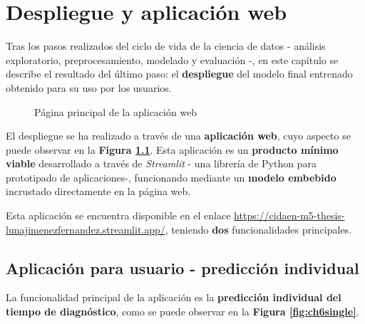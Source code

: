 \chapter{Despliegue y aplicación web}

Tras los pasos realizados del ciclo de vida de la ciencia de datos - análisis exploratorio, preprocesamiento, modelado y evaluación -, en este capítulo se describe el resultado del último paso: el \textbf{despliegue} del modelo final entrenado obtenido para su uso por los usuarios.

\begin{figure}[h]
	\vspace{-6mm}
	\centering
	\captionsetup{belowskip=-20pt, justification=centering}
	\caption{Página principal de la aplicación web}
	\label{fig:ch6main}
\end{figure}

El despliegue se ha realizado a través de una \textbf{aplicación web}, cuyo aspecto se puede observar en la \textbf{Figura \ref{fig:ch6main}}. Esta aplicación es un \textbf{producto mínimo viable} desarrollado a través de \textit{Streamlit} - una librería de Python para prototipado de aplicaciones-, funcionando mediante un \textbf{modelo embebido} incrustado directamente en la página web. 

Esta aplicación se encuentra disponible en el enlace \url{https://cidaen-m5-thesis-lunajimenezfernandez.streamlit.app/}, teniendo \textbf{dos} funcionalidades principales.


\vspace*{-4mm}
\section{Aplicación para usuario - predicción individual}

La funcionalidad principal de la aplicación es la \textbf{predicción individual del tiempo de diagnóstico}, como se puede observar en la \textbf{Figura \ref{fig:ch6single}}.

